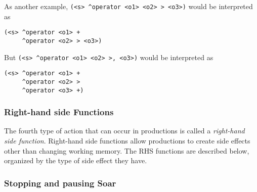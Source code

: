 As another example, \verb|(<s> ^operator <o1> <o2> > <o3>)| would be interpreted as

\begin{verbatim}
(<s> ^operator <o1> +
     ^operator <o2> > <o3>)
\end{verbatim}

But \verb|(<s> ^operator <o1> <o2> >, <o3>)| would be interpreted as

\begin{verbatim}
(<s> ^operator <o1> +
     ^operator <o2> >
     ^operator <o3> +)
\end{verbatim}


\subsubsection{Right-hand side Functions}

The fourth type of action that can occur in productions is called a \emph{right-hand side function}.  Right-hand side functions allow productions to create side effects other than changing working memory.  The RHS functions are described below, organized by the type of side effect they have.

\subsubsection*{Stopping and pausing Soar}
\label{SYNTAX-pm-rhs-stopping}

